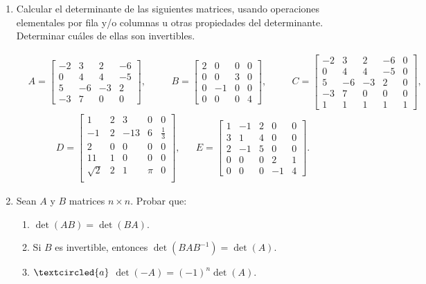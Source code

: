 \documentclass[a4paper,12pt,twoside,spanish,reqno]{amsbook}
\numberwithin{equation}{section}
\begin{document}
\begin{enumerate}[topsep=6pt,itemsep=.4cm]
\item Calcular el determinante de las siguientes matrices, usando operaciones elementales por fila y/o columnas u otras propiedades del determinante. Determinar cuáles de ellas son invertibles.

\begin{align*}
&A=
\begin{bmatrix}
-2&3&2&-6\\ 0&4&4&-5\\ 5&-6&-3&2\\ -3&7&0&0 \end{bmatrix},\quad
&&B=\begin{bmatrix} 2&0&0&0\\ 0&0&3&0\\ 0&-1&0&0\\ 0&0&0&4\end{bmatrix},\quad
&&
C=\begin{bmatrix}
  -2&3&2&-6&0\\
0&4&4&-5&0\\
5&-6&-3&2&0\\
-3&7&0&0&0\\
1&1&1&1&1
  \end{bmatrix},
\end{align*}
\begin{align*}
D=\begin{bmatrix}
1&2&3&0&0\\
-1&2&-13&6&\frac{1}{3}\\
2&0&0&0&0\\
11&1&0&0&0\\
\sqrt{2}&2&1&\pi&0\\
\end{bmatrix},&&
E=\begin{bmatrix}
1&-1&2&0&0\\ 3&1&4&0&0\\ 2&-1&5&0&0 \\0&0&0&2&1\\ 0&0&0&-1&4
\end{bmatrix}.
\end{align*}

\item Sean $A$ y  $B$ matrices $n \times n$. Probar que:


\begin{enumerate}
	\item $\det(AB) = \det (BA)$.
	\item Si $B$ es invertible, entonces $\det(B A B^{-1}) = \det (A)$.
	\item\label{-A} $\textcircled{a}$ $\det(-A) = (-1)^n\det (A)$.
\end{enumerate}



\end{enumerate}
\end{document}
